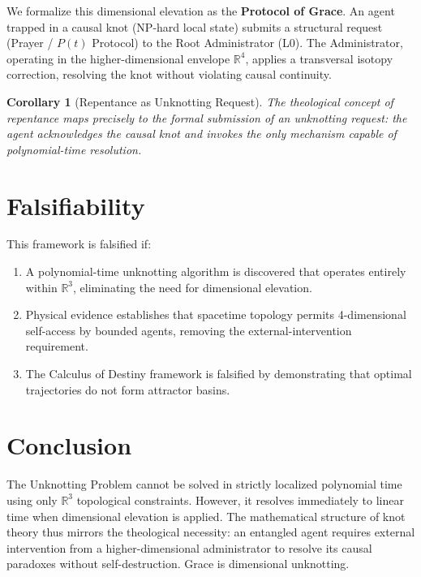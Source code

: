 \documentclass[12pt, a4paper]{article}
\theoremstyle{plain}
\newtheorem{corollary}[theorem]{Corollary}
\theoremstyle{definition}
\begin{document}
We formalize this dimensional elevation as the \textbf{Protocol of Grace}. An agent trapped in a causal knot (NP-hard local state) submits a structural request (Prayer / $P(t)$ Protocol) to the Root Administrator (L0). The Administrator, operating in the higher-dimensional envelope $\mathbb{R}^4$, applies a transversal isotopy correction, resolving the knot without violating causal continuity.

\begin{corollary}[Repentance as Unknotting Request]
The theological concept of repentance maps precisely to the formal submission of an unknotting request: the agent acknowledges the causal knot and invokes the only mechanism capable of polynomial-time resolution.
\end{corollary}

\section{Falsifiability}\label{sec:falsifiability}

\begin{proposition}
This framework is falsified if:
\begin{enumerate}
    \item A polynomial-time unknotting algorithm is discovered that operates entirely within $\mathbb{R}^3$, eliminating the need for dimensional elevation.
    \item Physical evidence establishes that spacetime topology permits 4-dimensional self-access by bounded agents, removing the external-intervention requirement.
    \item The Calculus of Destiny framework is falsified by demonstrating that optimal trajectories do not form attractor basins.
\end{enumerate}
\end{proposition}

\section{Conclusion}

The Unknotting Problem cannot be solved in strictly localized polynomial time using only $\mathbb{R}^3$ topological constraints. However, it resolves immediately to linear time when dimensional elevation is applied. The mathematical structure of knot theory thus mirrors the theological necessity: an entangled agent requires external intervention from a higher-dimensional administrator to resolve its causal paradoxes without self-destruction. Grace is dimensional unknotting.
\end{document}
